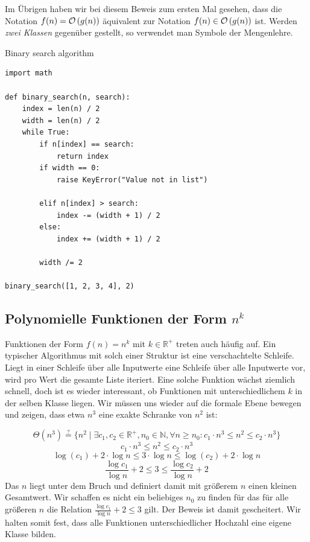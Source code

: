 Im Übrigen haben wir bei diesem Beweis zum ersten Mal gesehen, dass die Notation $f(n) = \mathcal{O}\left(g(n)\right)$ äquivalent zur Notation $f(n) \in \mathcal{O}\left(g(n)\right)$ ist. Werden \emph{zwei Klassen} gegenüber gestellt, so verwendet man Symbole der Mengenlehre.
%
\begin{algorithm}
\caption{Binary search algorithm}
\label{algo:binsearch}
\begin{lstlisting}
import math

def binary_search(n, search):
    index = len(n) / 2
    width = len(n) / 2
    while True:
        if n[index] == search:
            return index
        if width == 0:
            raise KeyError("Value not in list")

        elif n[index] > search:
            index -= (width + 1) / 2
        else:
            index += (width + 1) / 2

        width /= 2

binary_search([1, 2, 3, 4], 2)
\end{lstlisting}
\end{algorithm}
%
\subsection{Polynomielle Funktionen der Form $n^k$}
%
Funktionen der Form $f(n) = n^k$ mit $k \in \mathbb{R}^+$ treten auch häufig auf. Ein typischer Algorithmus mit solch einer Struktur ist eine verschachtelte Schleife. Liegt in einer Schleife über alle Inputwerte eine Schleife über alle Inputwerte vor, wird pro Wert die gesamte Liste iteriert. Eine solche Funktion wächst ziemlich schnell, doch ist es wieder interessant, ob Funktionen mit unterschiedlichem $k$ in der selben Klasse liegen. Wir müssen uns wieder auf die formale Ebene bewegen und zeigen, dass etwa $n^3$ eine exakte Schranke von $n^2$ ist:

\[
 \Theta(n^3) \stackrel{?}{=} \{ n^2 \mid \exists c_1, c_2 \in \mathbb{R}^+, n_0 \in \mathbb{N},
                                \forall n \geq n_0: c_1 \cdot n^3 \leq n^2 \leq c_2 \cdot n^3 \}
\] \[
  c_1 \cdot n^3 \leq n^2 \leq c_2 \cdot n^3
\] \[
  \log{(c_1)} + 2\cdot\log{n} \leq 3\cdot\log{n} \leq \log{(c_2)} + 2\cdot\log{n}
\] \[
  \frac{\log{c_1}}{\log{n}} + 2 \leq 3 \leq \frac{\log{c_2}}{\log{n}} + 2
\]
Das $n$ liegt unter dem Bruch und definiert damit mit größerem $n$ einen kleinen Gesamtwert. Wir schaffen es nicht ein beliebiges $n_0$ zu finden für das für alle größeren $n$ die Relation $\frac{\log{c_1}}{\log{n}} + 2 \leq 3$ gilt. Der Beweis ist damit gescheitert. Wir halten somit fest, dass alle Funktionen unterschiedlicher Hochzahl eine eigene Klasse bilden.
%
